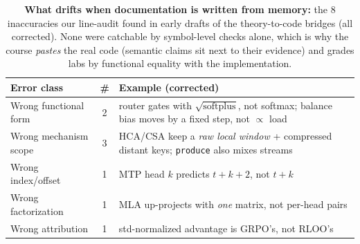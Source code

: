 \begin{table}[t]
\centering
\small
\begin{tabular}{@{}p{2.35cm}cp{3.6cm}@{}}
\toprule
\textbf{Error class} & \textbf{\#} & \textbf{Example (corrected)} \\
\midrule
Wrong functional form & 2 & router gates with $\sqrt{\mathrm{softplus}}$, not softmax; balance bias moves by a fixed step, not $\propto$ load \\
Wrong mechanism scope & 3 & HCA/CSA keep a \emph{raw local window} + compressed distant keys; \texttt{produce} also mixes streams \\
Wrong index/offset & 1 & MTP head $k$ predicts $t{+}k{+}2$, not $t{+}k$ \\
Wrong factorization & 1 & MLA up-projects with \emph{one} matrix, not per-head pairs \\
Wrong attribution & 1 & std-normalized advantage is GRPO's, not RLOO's \\
\bottomrule
\end{tabular}
\caption{\textbf{What drifts when documentation is written from memory:} the 8
inaccuracies our line-audit found in early drafts of the theory-to-code
bridges (all corrected). None were catchable by symbol-level checks alone,
which is why the course \emph{pastes} the real code (semantic claims sit next
to their evidence) and grades labs by functional equality with the
implementation.}
\label{tab:audit}
\end{table}
